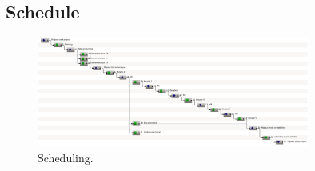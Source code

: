 

\subsection{Schedule}
  

  \begin{figure}
  	\centering
  	\includegraphics[width=0.8\textwidth,natwidth=1504,natheight=604]{Gantt.png}
  	\caption{\label{fig:Gantt Chart}Scheduling.}
  \end{figure}
  
